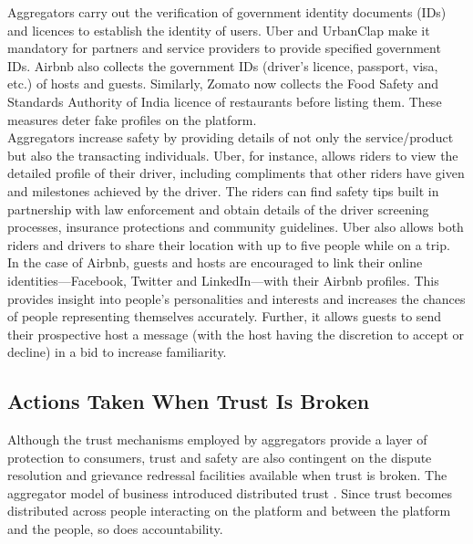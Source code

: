 \documentclass[a4paper, 12pt, twoside]{article}
\begin{document}
Aggregators carry out the verification of government identity documents (IDs) and licences to establish the identity of users. Uber and UrbanClap make it mandatory for partners and service providers to provide specified government IDs. Airbnb also collects the government IDs (driver’s licence, passport, visa, etc.) of hosts and guests. Similarly, Zomato now collects the Food Safety and Standards Authority of India licence of restaurants before listing them. These measures deter fake profiles on the platform.\\

Aggregators increase safety by providing details of not only the service/product but also the transacting individuals. Uber, for instance, allows riders to view the detailed profile of their driver, including compliments that other riders have given and milestones achieved by the driver. The riders can find safety tips built in partnership with law enforcement and obtain details of the driver screening processes, insurance protections and community guidelines. Uber also allows both riders and drivers to share their location with up to five people while on a trip. \\

In the case of Airbnb, guests and hosts are encouraged to link their online identities—Facebook, Twitter and LinkedIn—with their Airbnb profiles. This provides insight into people’s personalities and interests and increases the chances of people representing themselves accurately. Further, it allows guests to send their prospective host a message (with the host having the discretion to accept or decline) in a bid to increase familiarity. 

               
                    
                    \subsection{Actions Taken When Trust Is Broken}
                    
                    Although the trust mechanisms employed by aggregators provide a layer of protection to consumers, trust and safety are also contingent on the dispute resolution and grievance redressal facilities available when trust is broken. The aggregator model of business introduced distributed trust \parencite{BotsmanR}. Since trust becomes distributed across people interacting on the platform and between the platform and the people, so does accountability.\\
\end{document}
